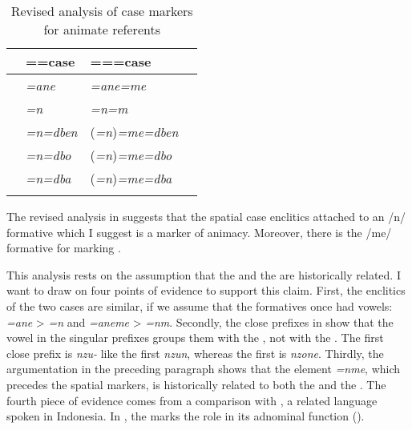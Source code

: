 \begin{table}
\begin{center}
\caption{Revised analysis of case markers for animate referents} 
\label{casediscussionshist} 
	\begin{tabularx}{\textwidth}{XXll}	
		\lsptoprule
		&=\Anim={case}&=\Anim=\Nsg{}={case}\\ \midrule
		\Poss{}&\emph{=ane}&\emph{=ane=me}\\ 
		\Dat{}&\emph{=n}&\emph{=n=m}\\ 
		\Loc{}&\emph{=n=dben}&(\emph{=n})\emph{=me=dben}\\ 
		\All{}&\emph{=n=dbo}&(\emph{=n})\emph{=me=dbo}\\ 
		\Abl{}&\emph{=n=dba}&(\emph{=n})\emph{=me=dba}\\ 
		\lspbottomrule
	\end{tabularx}
\end{center}
\end{table}%

The revised analysis in  suggests that the spatial case enclitics attached to an /n/  formative which I suggest is a marker of animacy. Moreover, there is the /me/ formative for marking  .%

This analysis rests on the assumption that the  and the  are historically related. I want to draw on four points of evidence to support this claim. First, the enclitics of the two cases are similar, if we assume that the  formatives once had vowels: \emph{=ane} > \emph{=n} and \emph{=aneme} > \emph{=nm}. Secondly, the close  prefixes in  show that the vowel in the singular prefixes groups them with the , not with the . The first  close  prefix is \emph{nzu-} like the first    \emph{nzun}, whereas the first    is \emph{nzone}. Thirdly, the argumentation in the preceding paragraph shows that the element \emph{=nme}, which precedes the spatial  markers, is historically related to both the  and the . The fourth piece of evidence comes from a comparison with , a related  language spoken in Indonesia. In , the  marks the  role in its adnominal function (\citealt{Carroll:Ngkolmpu}).%

